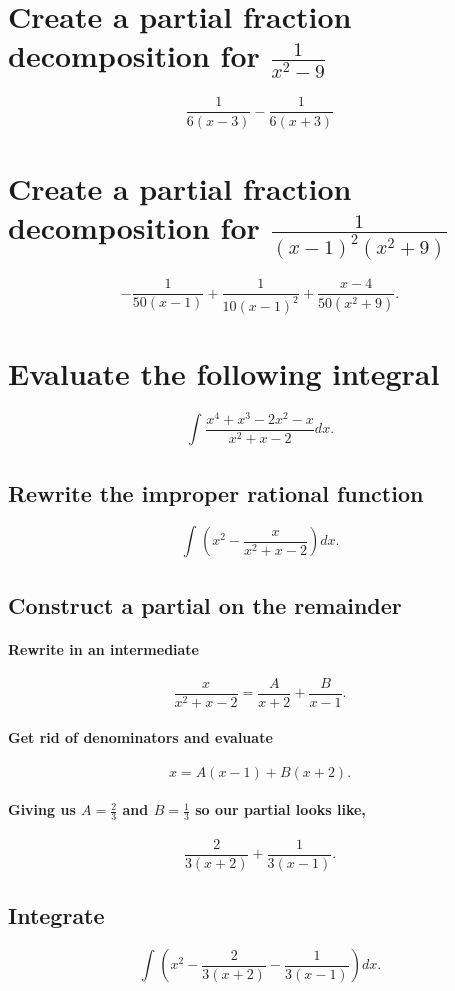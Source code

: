 \documentclass[a4paper]{article}
\title{Quiz #5}
\author{yawnbo}
\date{\today}
\begin{document}
\section{Create a partial fraction decomposition for $\frac{1}{x^2-9}$}%
\label{sec:Question 1}

\[
\frac{1}{6\left( x-3 \right) } - \frac{1}{6\left( x+3 \right) }
\] 

\section{Create a partial fraction decomposition for $\frac{1}{\left( x-1 \right) ^2\left( x^2+9 \right) }$}%
\[
  -\frac{1}{50\left( x-1 \right) }+\frac{1}{10\left( x-1 \right) ^2}+ \frac{x-4}{50\left( x^2+9 \right) }
.\] 
\newpage
\section{Evaluate the following integral}%

\[
  \int_{}^{} \frac{x^{4}+x^3-2x^2-x}{x^2+x-2}dx
.\] 
\subsection{Rewrite the improper rational function}%
\label{sub:Rewrite the improper rational function}
\[
\int_{}^{} \left(   x^2-\frac{x}{x^2+x-2}\right)dx
.\] 
\subsection{Construct a partial on the remainder}%
\label{sub:Construct a partial}
\paragraph{Rewrite in an intermediate}
\[
\frac{x}{x^2+x-2}=\frac{A}{x+2}+\frac{B}{x-1}
.\] 
\paragraph{Get rid of denominators and evaluate}
\[
x=A(x-1)+B(x+2)
.\] 
\paragraph{Giving us $A=\frac{2}{3}$ and $B=\frac{1}{3}$ so our partial looks like,}
\[
\frac{2}{3\left( x+2 \right) }+\frac{1}{3\left( x-1 \right) }
.\] 
\subsection{Integrate}%
\label{sub:Integrate}
\[
  \int_{}^{} \left(   x^2-\frac{2}{3\left( x+2 \right) }-\frac{1}{3\left( x-1 \right) }\right)dx
.\] 
\end{document}
